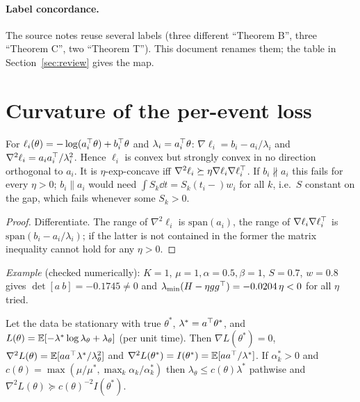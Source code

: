 \paragraph{Label concordance.}
The source notes reuse several labels (three different ``Theorem B'', three ``Theorem C'', two ``Theorem T'').
This document renames them; the table in Section~\ref{sec:review} gives the map.

\section{Curvature of the per-event loss}\label{sec:curvature}

\begin{lemma}\label{lem:rankone}\Pt{}
For $\ell_i(\theta)=-\log(a_i^{\top}\theta)+b_i^{\top}\theta$ and $\lambda_i=a_i^{\top}\theta$:
$\nabla\ell_i=b_i-a_i/\lambda_i$ and $\nabla^2\ell_i=a_ia_i^{\top}/\lambda_i^2$.
Hence $\ell_i$ is convex but strongly convex in no direction orthogonal to $a_i$.
It is $\eta$-exp-concave iff $\nabla^2\ell_i\succeq\eta\nabla\ell_i\nabla\ell_i^{\top}$.
If $b_i\not\parallel a_i$ this fails for every $\eta>0$; $b_i\parallel a_i$ would need $\int S_k\dd t=S_k(t_i-)w_i$ for all $k$, i.e.\ $S$ constant on the gap,
which fails whenever some $S_k>0$.
\end{lemma}
\begin{proof}
Differentiate. The range of $\nabla^2\ell_i$ is $\mathrm{span}(a_i)$, the range of $\nabla\ell_i\nabla\ell_i^{\top}$ is $\mathrm{span}(b_i-a_i/\lambda_i)$;
if the latter is not contained in the former the matrix inequality cannot hold for any $\eta>0$.
\end{proof}
\emph{Example} (checked numerically): $K=1$, $\mu=1,\alpha=0.5,\beta=1$, $S=0.7$, $w=0.8$ gives $\det[a\ b]=-0.1745\ne0$ and $\lambda_{\min}(H-\eta gg^{\top})=-0.0204\,\eta<0$ for all $\eta$ tried.

\begin{lemma}\label{lem:expcurv}\Pt{}
Let the data be stationary with true $\theta^*$, $\lambda^*=a^{\top}\theta^*$, and $L(\theta)=\mathbb{E}[-\lambda^*\log\lambda_\theta+\lambda_\theta]$ (per unit time). Then $\nabla L(\theta^*)=0$,
$\nabla^2L(\theta)=\mathbb{E}[aa^{\top}\lambda^*/\lambda_\theta^2]$ and $\nabla^2L(\theta^*)=I(\theta^*)=\mathbb{E}[aa^{\top}/\lambda^*]$.
If $\alpha^*_k>0$ and $c(\theta)=\max(\mu/\mu^*,\max_k\alpha_k/\alpha^*_k)$ then $\lambda_\theta\le c(\theta)\lambda^*$ pathwise and $\nabla^2L(\theta)\succeq c(\theta)^{-2}I(\theta^*)$.
\end{lemma}

